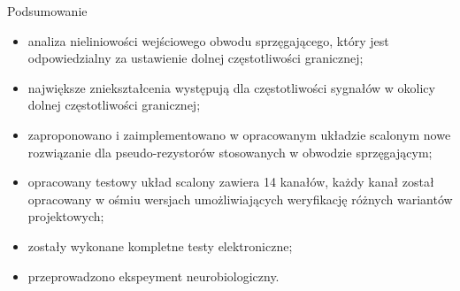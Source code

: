 \documentclass[aspectratio=1610, polish]{beamer}
\begin{document}
\begin{frame}{Podsumowanie}
\begin{itemize}
    \item  analiza nieliniowości wejściowego obwodu sprzęgającego, który jest odpowiedzialny za ustawienie dolnej częstotliwości granicznej;
    \item największe zniekształcenia występują dla częstotliwości sygnałów w okolicy dolnej częstotliwości granicznej;
    \item zaproponowano i zaimplementowano w opracowanym układzie scalonym nowe rozwiązanie dla pseudo-rezystorów stosowanych w obwodzie sprzęgającym;
    \item  opracowany testowy układ scalony zawiera 14 kanałów, każdy kanał został opracowany w ośmiu wersjach umożliwiających weryfikację różnych wariantów projektowych;
    \item zostały wykonane kompletne testy elektroniczne;
    \item przeprowadzono ekspeyment neurobiologiczny.
\end{itemize}
\end{frame}
\maketitle


% 
\end{document}
